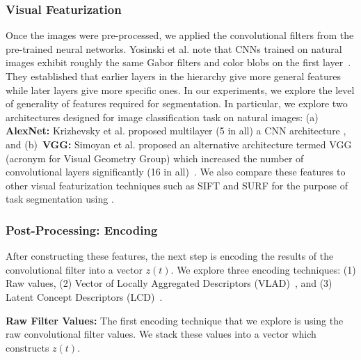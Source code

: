 \documentclass[0-main.tex]{subfiles}
\begin{document}
\setlength{\textfloatsep}{5pt}%



\subsubsection{Visual Featurization}
Once the images were pre-processed, we applied the convolutional filters from the pre-trained neural networks.
Yosinski et al. note that CNNs trained on natural images exhibit roughly the same Gabor filters and color blobs on the first layer~\cite{yosinski2014NIPS}. 
They established that earlier layers in the hierarchy give more general features while later layers give more specific ones. In our experiments, we explore the level of generality of features required for segmentation. 
In particular, we explore two architectures designed for image classification task on natural images: (a) \textbf{AlexNet: } Krizhevsky et al. proposed multilayer (5 in all) a CNN architecture \cite{krizhevsky2012imagenet}, and (b)~\textbf{VGG: } Simoyan et al. proposed an alternative architecture termed VGG (acronym for Visual Geometry Group) which increased the number of convolutional layers significantly (16 in all)~\cite{simonyan2014very}.
We also compare these features to other visual featurization techniques such as SIFT and SURF for the purpose of task segmentation using \TSC.

\subsubsection{Post-Processing: Encoding}
After constructing these features, the next step is encoding the results of the convolutional filter into a vector $z(t)$.
We explore three encoding techniques: (1) Raw values, (2) Vector of Locally Aggregated Descriptors (VLAD)~\cite{arandjelovic2013all}, and (3) Latent Concept Descriptors (LCD)~\cite{xu2014discriminative}.

\iffalse
\vspace{0.25em}
\noindent\textbf{Raw Filter Values: } The first encoding technique that we explore is using the raw convolutional filter values. We stack these values into a vector which constructs $z(t)$.
\end{document}

